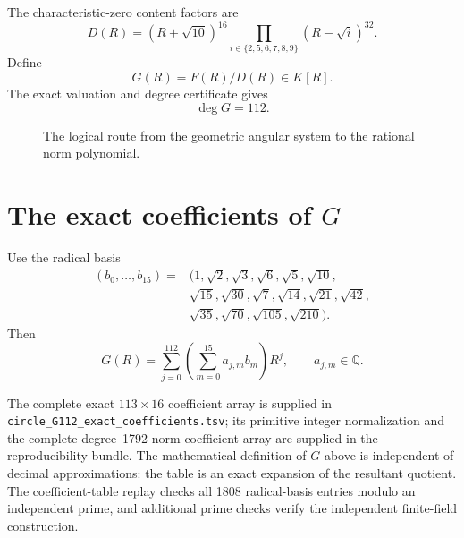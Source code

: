 \documentclass[11pt,a4paper]{article}
\newcommand{\Res}{\operatorname{Res}}
\begin{document}
The characteristic-zero content factors are
\[
 D(R)=(R+\sqrt{10})^{16}
 \prod_{i\in\{2,5,6,7,8,9\}}(R-\sqrt{i})^{32}.
\]
Define
\[
 G(R)=F(R)/D(R)\in K[R].
\]
The exact valuation and degree certificate gives
\[
 \deg G=112.
\]

\begin{figure}[ht]
\centering
{}
\caption{The logical route from the geometric angular system to the rational
norm polynomial.}
\label{fig:flow}
\end{figure}

\section{The exact coefficients of $G$}

Use the radical basis
\[
\begin{aligned}
 (b_0,\ldots,b_{15})={}&(1,\sqrt2,\sqrt3,\sqrt6,\sqrt5,\sqrt{10},\\
 &\sqrt{15},\sqrt{30},\sqrt7,\sqrt{14},\sqrt{21},\sqrt{42},\\
 &\sqrt{35},\sqrt{70},\sqrt{105},\sqrt{210}).
\end{aligned}
\]
Then
\[
 G(R)=\sum_{j=0}^{112}\left(\sum_{m=0}^{15}a_{j,m}b_m\right)R^j,
 \qquad a_{j,m}\in\mathbb{Q}.
\]

\begin{sloppypar}
The complete exact $113\times16$ coefficient array is supplied in
\texttt{circle\_G112\_exact\_coefficients.tsv}; its primitive integer normalization
and
the complete degree--1792 norm coefficient array are supplied in the
reproducibility bundle.  The mathematical definition of $G$ above is
independent of decimal approximations: the table is an exact expansion of
the resultant quotient.  The coefficient-table replay checks all 1808
radical-basis entries modulo an independent prime, and additional prime
checks verify the independent finite-field construction.
\end{sloppypar}
\end{document}
